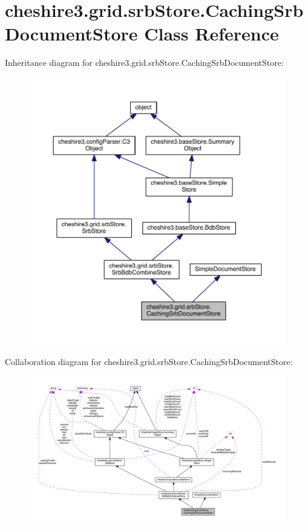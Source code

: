 \hypertarget{classcheshire3_1_1grid_1_1srb_store_1_1_caching_srb_document_store}{\section{cheshire3.\-grid.\-srb\-Store.\-Caching\-Srb\-Document\-Store Class Reference}
\label{classcheshire3_1_1grid_1_1srb_store_1_1_caching_srb_document_store}
}


Inheritance diagram for cheshire3.\-grid.\-srb\-Store.\-Caching\-Srb\-Document\-Store\-:
\nopagebreak
\begin{figure}[H]
\begin{center}
\leavevmode
\includegraphics[width=350pt]{classcheshire3_1_1grid_1_1srb_store_1_1_caching_srb_document_store__inherit__graph}
\end{center}
\end{figure}


Collaboration diagram for cheshire3.\-grid.\-srb\-Store.\-Caching\-Srb\-Document\-Store\-:
\nopagebreak
\begin{figure}[H]
\begin{center}
\leavevmode
\includegraphics[width=350pt]{classcheshire3_1_1grid_1_1srb_store_1_1_caching_srb_document_store__coll__graph}
\end{center}
\end{figure}
